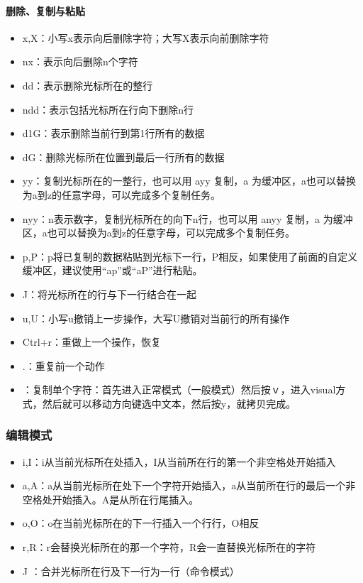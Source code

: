 \paragraph{删除、复制与粘贴}
\begin{itemize}
\item x,X：小写x表示向后删除字符；大写X表示向前删除字符
\item nx：表示向后删除n个字符
\item dd：表示删除光标所在的整行
\item ndd：表示包括光标所在行向下删除n行
\item d1G：表示删除当前行到第1行所有的数据
\item dG：删除光标所在位置到最后一行所有的数据
\item yy：复制光标所在的一整行，也可以用 ayy 复制，a 为缓冲区，a也可以替换为a到z的任意字母，可以完成多个复制任务。
\item nyy：n表示数字，复制光标所在的向下n行，也可以用 anyy 复制，a 为缓冲区，a也可以替换为a到z的任意字母，可以完成多个复制任务。
\item p,P：p将已复制的数据粘贴到光标下一行，P相反，如果使用了前面的自定义缓冲区，建议使用“ap”或“aP”进行粘贴。
\item J：将光标所在的行与下一行结合在一起
\item u,U：小写u撤销上一步操作，大写U撤销对当前行的所有操作
\item Ctrl+r：重做上一个操作，恢复
\item .：重复前一个动作
\item ：复制单个字符：首先进入正常模式（一般模式）然后按ｖ，进入visual方式，然后就可以移动方向键选中文本，然后按y，就拷贝完成。
\end{itemize}


\subsubsection{编辑模式}
\begin{itemize}
\item i,I：i从当前光标所在处插入，I从当前所在行的第一个非空格处开始插入
\item a,A：a从当前光标所在处下一个字符开始插入，a从当前所在行的最后一个非空格处开始插入。A是从所在行尾插入。
\item o,O：o在当前光标所在的下一行插入一个行行，O相反
\item r,R：r会替换光标所在的那一个字符，R会一直替换光标所在的字符
\item J ：合并光标所在行及下一行为一行（命令模式）
\end{itemize}



